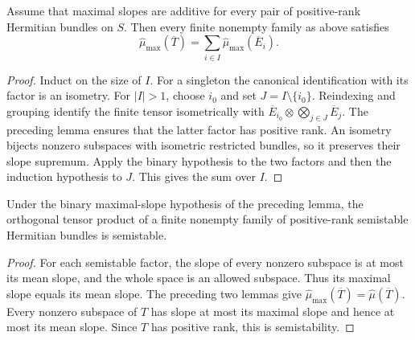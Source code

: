 \begin{lemma}
\label{lem:finite-tensor-slopes-of-binary}
\leanok
Assume that maximal slopes are additive for every pair of positive-rank
Hermitian bundles on $S$. Then every finite nonempty family as above satisfies
\[
 \widehat\mu_{\max}(\overline T)=
 \sum_{i\in I}\widehat\mu_{\max}(\overline E_i).
\]
\end{lemma}
\begin{proof}
Induct on the size of $I$. For a singleton the canonical identification
with its factor is an isometry. For $|I|>1$, choose $i_0$ and set
$J=I\setminus\{i_0\}$. Reindexing and grouping identify the finite tensor
isometrically with $\overline E_{i_0}\otimes\bigotimes_{j\in J}\overline E_j$.
The preceding lemma ensures that the latter factor has positive rank.
An isometry bijects nonzero subspaces with isometric restricted bundles,
so it preserves their slope supremum. Apply the binary hypothesis to the
two factors and then the induction hypothesis to $J$. This gives the sum
over $I$.
\end{proof}

\begin{corollary}
\label{cor:finite-tensor-semistability-of-binary}
\leanok
Under the binary maximal-slope hypothesis of the preceding lemma, the
orthogonal tensor product of a finite nonempty family of positive-rank
semistable Hermitian bundles is semistable.
\end{corollary}
\begin{proof}
For each semistable factor, the slope of every nonzero subspace is at most
its mean slope, and the whole space is an allowed subspace. Thus its maximal
slope equals its mean slope. The preceding two lemmas give
$\widehat\mu_{\max}(\overline T)=\widehat\mu(\overline T)$.
Every nonzero subspace of $T$ has slope at most its maximal slope and hence
at most its mean slope. Since $T$ has positive rank, this is semistability.
\end{proof}

